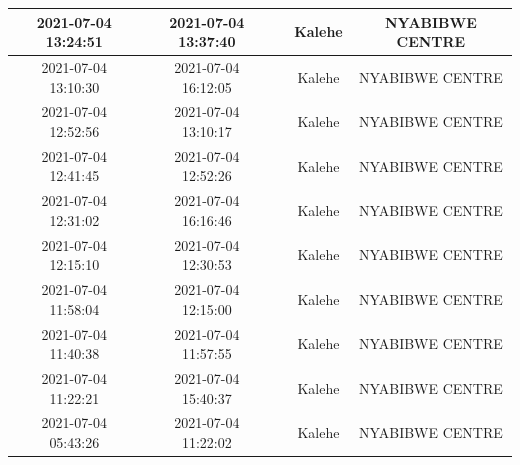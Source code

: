 \documentclass[
]{book}
\begin{document}
\begin{table}
\begin{tabular}[t]{c|c|>{}c|c|c}
\hline
2021-07-04 13:24:51 & 2021-07-04 13:37:40 & \cellcolor[HTML]{2A788E}{\textcolor{white}{13}} & Kalehe & NYABIBWE CENTRE\\
\hline
2021-07-04 13:10:30 & 2021-07-04 16:12:05 & \cellcolor[HTML]{20938C}{\textcolor{white}{182}} & Kalehe & NYABIBWE CENTRE\\
\hline
2021-07-04 12:52:56 & 2021-07-04 13:10:17 & \cellcolor[HTML]{2A788E}{\textcolor{white}{17}} & Kalehe & NYABIBWE CENTRE\\
\hline
2021-07-04 12:41:45 & 2021-07-04 12:52:26 & \cellcolor[HTML]{2C718E}{\textcolor{white}{11}} & Kalehe & NYABIBWE CENTRE\\
\hline
2021-07-04 12:31:02 & 2021-07-04 16:16:46 & \cellcolor[HTML]{2C718E}{\textcolor{white}{226}} & Kalehe & NYABIBWE CENTRE\\
\hline
2021-07-04 12:15:10 & 2021-07-04 12:30:53 & \cellcolor[HTML]{306A8E}{\textcolor{white}{16}} & Kalehe & NYABIBWE CENTRE\\
\hline
2021-07-04 11:58:04 & 2021-07-04 12:15:00 & \cellcolor[HTML]{22A884}{\textcolor{white}{17}} & Kalehe & NYABIBWE CENTRE\\
\hline
2021-07-04 11:40:38 & 2021-07-04 11:57:55 & \cellcolor[HTML]{3A548C}{\textcolor{white}{17}} & Kalehe & NYABIBWE CENTRE\\
\hline
2021-07-04 11:22:21 & 2021-07-04 15:40:37 & \cellcolor[HTML]{443B84}{\textcolor{white}{258}} & Kalehe & NYABIBWE CENTRE\\
\hline
2021-07-04 05:43:26 & 2021-07-04 11:22:02 & \cellcolor[HTML]{1F9A8A}{\textcolor{white}{339}} & Kalehe & NYABIBWE CENTRE\\
\hline
\end{tabular}
\end{table}
\end{document}
